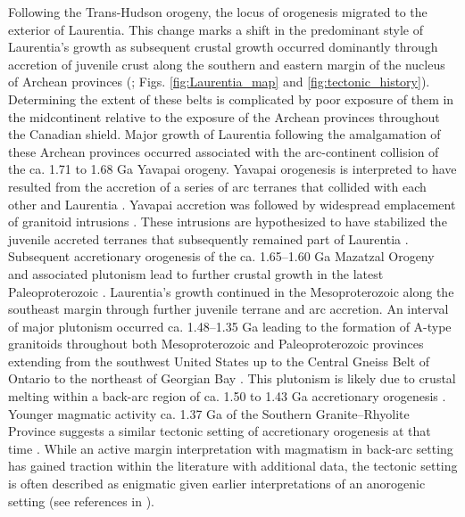\documentclass[11pt,letterpaper]{article}
\begin{document}
Following the Trans-Hudson orogeny, the locus of orogenesis migrated to the exterior of Laurentia. This change marks a shift in the predominant style of Laurentia's growth as subsequent crustal growth occurred dominantly through accretion of juvenile crust along the southern and eastern margin of the nucleus of Archean provinces (\citealp{Whitmeyer2007a}; Figs. \ref{fig:Laurentia_map} and \ref{fig:tectonic_history}). Determining the extent of these belts is complicated by poor exposure of them in the midcontinent relative to the exposure of the Archean provinces throughout the Canadian shield. Major growth of Laurentia following the amalgamation of these Archean provinces occurred associated with the arc-continent collision of the ca. 1.71 to 1.68 Ga Yavapai orogeny. Yavapai orogenesis is interpreted to have resulted from the accretion of a series of arc terranes that collided with each other and Laurentia \citep{Karlstrom2001a}. Yavapai accretion was followed by widespread emplacement of granitoid intrusions \citep{Whitmeyer2007a}. These intrusions are hypothesized to have stabilized the juvenile accreted terranes that subsequently remained part of Laurentia \citep{Whitmeyer2007a}. Subsequent accretionary orogenesis of the ca. 1.65–1.60 Ga Mazatzal Orogeny and associated plutonism lead to further crustal growth in the latest Paleoproterozoic \citep{Karlstrom1988a}. Laurentia's growth continued in the Mesoproterozoic along the southeast margin through further juvenile terrane and arc accretion. An interval of major plutonism occurred ca. 1.48–1.35 Ga leading to the formation of A-type granitoids throughout both Mesoproterozoic and Paleoproterozoic provinces extending from the southwest United States up to the Central Gneiss Belt of Ontario to the northeast of Georgian Bay \citep{Slagstad2009a}. This plutonism is likely due to crustal melting within a back-arc region of ca. 1.50 to 1.43 Ga accretionary orogenesis \citep{Bickford2015a}. Younger magmatic activity ca. 1.37 Ga  of the Southern Granite–Rhyolite Province suggests a similar tectonic setting of accretionary orogenesis at that time \citep{Bickford2015a}. While an active margin interpretation with magmatism in back‐arc setting has gained traction within the literature with additional data, the tectonic setting is often described as enigmatic given earlier interpretations of an anorogenic setting (see references in \citealp{Slagstad2009a}). 
\end{document}
